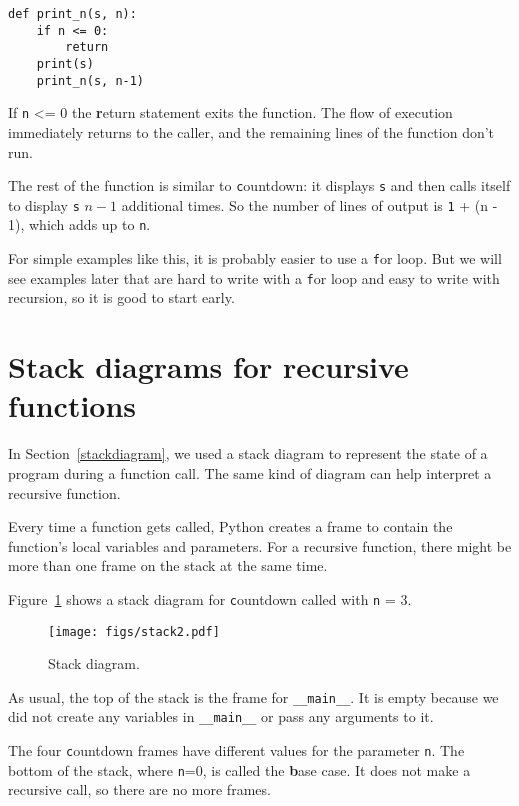 \documentclass[
DIV=11,
fontsize=12,
twoside,
headinclude=false,
titlepage=firstiscover,
abstract=true,
headsepline=true,
footsepline=true,
chapterprefix=true, %
headings=big,
bibliography=totoc,%
captions=tableheading
]{scrbook}
\theoremstyle{definition}
\begin{document}
\begin{lstlisting}
def print_n(s, n):
    if n <= 0:
        return
    print(s)
    print_n(s, n-1)
\end{lstlisting}
%
If {\texttt n <= 0} the {\textbf return statement} exits the function.  The
flow of execution immediately returns to the caller, and the remaining
lines of the function don't run.

The rest of the function is similar to {\texttt countdown}: it displays
{\texttt s} and then calls itself to display {\texttt s} $n-1$ additional
times.  So the number of lines of output is {\texttt 1 + (n - 1)}, which
adds up to {\texttt n}.

For simple examples like this, it is probably easier to use a {\texttt
for} loop.  But we will see examples later that are hard to write
with a {\texttt for} loop and easy to write with recursion, so it is
good to start early.


\section{Stack diagrams for recursive functions}
\label{recursive.stack}

In Section~\ref{stackdiagram}, we used a stack diagram to represent
the state of a program during a function call.  The same kind of
diagram can help interpret a recursive function.

Every time a function gets called, Python creates a
frame to contain the function's local variables and parameters.
For a recursive function, there might be more than one frame on the
stack at the same time.

Figure~\ref{fig.stack2} shows a stack diagram for {\texttt countdown} called with
{\texttt n = 3}.

\begin{figure}
\centerline
{\texttt{[image: figs/stack2.pdf]}}
\caption{Stack diagram.}
\label{fig.stack2}
\end{figure}


As usual, the top of the stack is the frame for \verb"__main__".
It is empty because we did not create any variables in 
\verb"__main__" or pass any arguments to it.

The four {\texttt countdown} frames have different values for the
parameter {\texttt n}.  The bottom of the stack, where {\texttt n=0}, is
called the {\textbf base case}.  It does not make a recursive call, so
there are no more frames.
\end{document}
